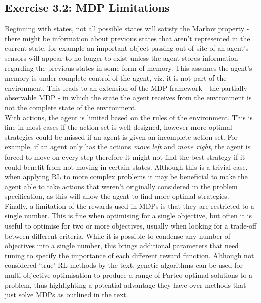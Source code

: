 \subsection*{Exercise 3.2: MDP Limitations}

Beginning with states, not all possible states will satisfy the Markov property - there might be information about previous states that aren't represented in the current state, for example an important object passing out of site of an agent's sensors will appear to no longer to exist unless the agent stores information regarding the previous states in some form of memory. This assumes the agent's memory is under complete control of the agent, viz. it is not part of the environment. This leads to an extension of the MDP framework - the partially observable MDP - in which the state the agent receives from the environment is not the complete state of the environment. \\

With actions, the agent is limited based on the rules of the environment. This is fine in most cases if the action set is well designed, however more optimal strategies could be missed if an agent is given an incomplete action set. For example, if an agent only has the actions \textit{move left} and \textit{move right}, the agent is forced to move on every step therefore it might not find the best strategy if it could benefit from not moving in certain states. Although this is a trivial case, when applying RL to more complex problems it may be beneficial to make the agent able to take actions that weren't originally considered in the problem specification, as this will allow the agent to find more optimal strategies. \\

Finally, a limitation of the rewards used in MDPs is that they are restricted to a single number. This is fine when optimising for a single objective, but often it is useful to optimise for two or more objectives, usually when looking for a trade-off between different criteria. While it is possible to condense any number of objectives into a single number, this brings additional parameters that need tuning to specify the importance of each different reward function. Although not considered `true' RL methods by the text, genetic algorithms can be used for multi-objective optimisation to produce a range of Parteo-optimal solutions to a problem, thus highlighting a potential advantage they have over methods that just solve MDPs as outlined in the text.